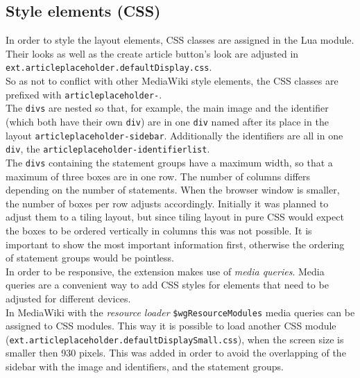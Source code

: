\subsection{Style elements (CSS)}

In order to style the layout elements, CSS classes are assigned in the Lua module. Their looks as well as the create article button's look are adjusted in \texttt{ext.articleplaceholder.defaultDisplay.css}. \\
So as not to conflict with other MediaWiki style elements, the CSS classes are prefixed with \texttt{\justify articleplaceholder-}. \\
The \texttt{\justify divs} are nested so that, for example, the main image and the identifier (which both have their own \texttt{div}) are in one \texttt{div} named after its place in the layout \texttt{\justify articleplaceholder-sidebar}. Additionally the identifiers are all in one \texttt{div}, the \texttt{\justify articleplaceholder-identifierlist}. \\
The \texttt{divs} containing the statement groups have a maximum width, so that a maximum of three boxes are in one row. The number of columns differs depending on the number of statements. When the browser window is smaller, the number of boxes per row adjusts accordingly. Initially it was planned to adjust them to a tiling layout, but since tiling layout in pure CSS would expect the boxes to be ordered vertically in columns this was not possible.  It is important to show the most important information first, otherwise the ordering of statement groups would be pointless. \\
In order to be responsive, the extension makes use of \textit{media queries}. Media queries are a convenient way to add CSS styles for elements that need to be adjusted for different devices. \citep[43]{mediaquery}\\
In MediaWiki with the \textit{resource loader} \texttt{\justify \$wgResourceModules} media queries can be assigned to CSS modules. This way it is possible to load another CSS module (\texttt{\justify ext.articleplaceholder.defaultDisplaySmall.css}), when the screen size is smaller then 930 pixels. This was added in order to avoid the overlapping of the sidebar with the image and identifiers, and the statement groups.